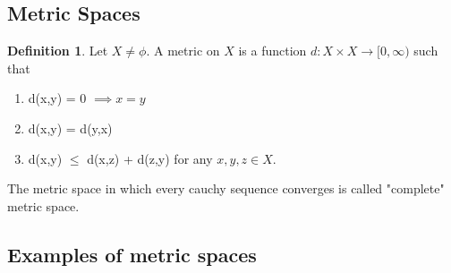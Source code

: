 \documentclass[12pt]{report}
\theoremstyle{definition}
\newtheorem{defn}{Definition}
\begin{document}
\subsection*{Metric Spaces}
\begin{defn}
    Let $X \neq \phi$. A metric on $X$ is a function $d:X \times X \to [0, \infty)$ such that 
    \begin{enumerate}
        \item d(x,y) = 0 $\implies x = y$
        \item d(x,y) = d(y,x)
        \item d(x,y) $\leq$ d(x,z) + d(z,y) for any $x,y,z \in X$.
    \end{enumerate}
\end{defn}
The metric space in which every cauchy sequence converges is called "complete" metric space.
\subsection*{Examples of metric spaces}
\end{document}
